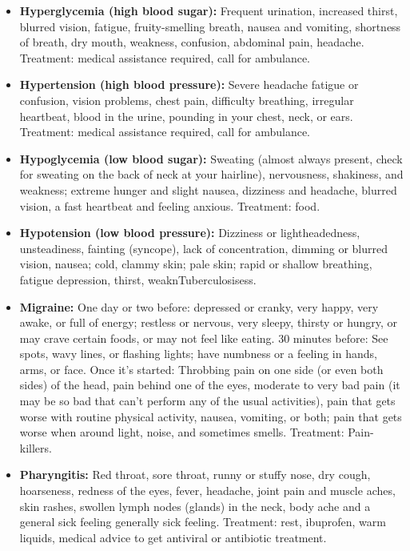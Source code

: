 \begin{itemize}
\item \textbf{Hyperglycemia (high blood sugar):} Frequent urination, increased thirst,
blurred vision, fatigue, fruity-smelling breath, nausea and vomiting, shortness of breath, dry mouth, weakness, confusion, abdominal pain, headache. Treatment: medical assistance required, call for ambulance.

\item \textbf{Hypertension (high blood pressure):} Severe headache fatigue or confusion, vision problems, chest pain, difficulty breathing, irregular heartbeat, blood in the urine, pounding in your chest, neck, or ears. Treatment: medical assistance required, call for ambulance.

\item \textbf{Hypoglycemia (low blood sugar):} Sweating (almost always present, check for sweating on the back of neck at your hairline), nervousness, shakiness, and weakness; extreme hunger and slight nausea, dizziness and headache, blurred vision, a fast heartbeat and feeling anxious. Treatment: food.

\item \textbf{Hypotension (low blood pressure):} Dizziness or lightheadedness, unsteadiness, fainting (syncope), lack of concentration, dimming or blurred vision, nausea; cold, clammy skin; pale skin; rapid or shallow breathing, fatigue depression, thirst, weaknTuberculosisess.

\item \textbf{Migraine:} One day or two before: depressed or cranky, very happy, very awake, or full of energy; restless or nervous, very sleepy, thirsty or hungry, or may crave certain foods, or may not feel like eating. 30 minutes before: See spots, wavy lines, or flashing lights; have numbness or a  feeling in hands, arms, or face. Once it's started: Throbbing pain on one side (or even both sides) of the head, pain behind one of the eyes, moderate to very bad pain (it may be so bad that can't perform any of the usual activities), pain that gets worse with routine physical activity, nausea, vomiting, or both; pain that gets worse when around light, noise, and sometimes smells. Treatment: Pain-killers.

\item \textbf{Pharyngitis:} Red throat, sore throat, runny or stuffy nose, dry cough, hoarseness, redness of the eyes, fever, headache, joint pain and muscle aches, skin rashes, swollen lymph nodes (glands) in the neck, body ache and a general sick feeling generally sick feeling. Treatment: rest, ibuprofen, warm liquids, medical advice to get antiviral or antibiotic treatment.


\end{itemize}
